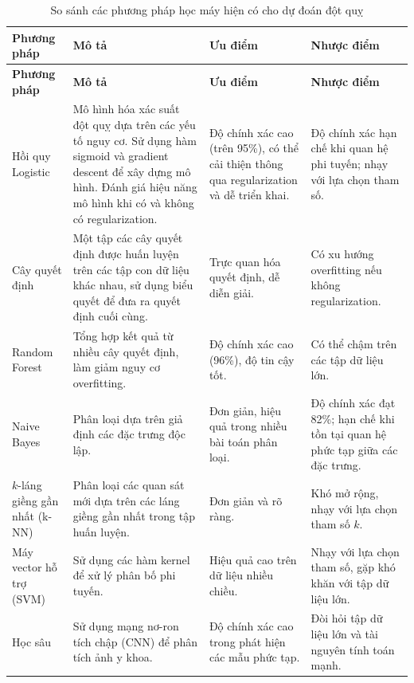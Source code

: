 \begin{longtable}{|L{2.3cm}|L{4.5cm}|L{3.7cm}|L{4.0cm}|}
	\caption{So sánh các phương pháp học máy hiện có cho dự đoán đột quỵ}
	\label{tab:methods}\\
	\hline
	\textbf{Phương pháp} &
	\textbf{Mô tả} &
	\textbf{Ưu điểm} &
	\textbf{Nhược điểm}\\
	\hline
	\endfirsthead
	
	\hline
	\textbf{Phương pháp} &
	\textbf{Mô tả} &
	\textbf{Ưu điểm} &
	\textbf{Nhược điểm}\\
	\hline
	\endhead
	
	Hồi quy Logistic &
	Mô hình hóa xác suất đột quỵ dựa trên các yếu tố nguy cơ. Sử dụng hàm sigmoid và gradient descent để xây dựng mô hình. Đánh giá hiệu năng mô hình khi có và không có regularization. &
	Độ chính xác cao (trên 95\%), có thể cải thiện thông qua regularization và dễ triển khai. &
	Độ chính xác hạn chế khi quan hệ phi tuyến; nhạy với lựa chọn tham số.\\
	\hline
	
	Cây quyết định &
	Một tập các cây quyết định được huấn luyện trên các tập con dữ liệu khác nhau, sử dụng biểu quyết để đưa ra quyết định cuối cùng. &
	Trực quan hóa quyết định, dễ diễn giải. &
	Có xu hướng overfitting nếu không regularization.\\
	\hline
	
	Random Forest &
	Tổng hợp kết quả từ nhiều cây quyết định, làm giảm nguy cơ overfitting. &
	Độ chính xác cao (96\%), độ tin cậy tốt. &
	Có thể chậm trên các tập dữ liệu lớn.\\
	\hline
	
	Naive Bayes &
	Phân loại dựa trên giả định các đặc trưng độc lập. &
	Đơn giản, hiệu quả trong nhiều bài toán phân loại. &
	Độ chính xác đạt 82\%; hạn chế khi tồn tại quan hệ phức tạp giữa các đặc trưng.\\
	\hline
	
	$k$-láng giềng gần nhất (k-NN) &
	Phân loại các quan sát mới dựa trên các láng giềng gần nhất trong tập huấn luyện. &
	Đơn giản và rõ ràng. &
	Khó mở rộng, nhạy với lựa chọn tham số $k$.\\
	\hline
	
	Máy vector hỗ trợ (SVM) &
	Sử dụng các hàm kernel để xử lý phân bố phi tuyến. &
	Hiệu quả cao trên dữ liệu nhiều chiều. &
	Nhạy với lựa chọn tham số, gặp khó khăn với tập dữ liệu lớn.\\
	\hline
	
	Học sâu &
	Sử dụng mạng nơ-ron tích chập (CNN) để phân tích ảnh y khoa. &
	Độ chính xác cao trong phát hiện các mẫu phức tạp. &
	Đòi hỏi tập dữ liệu lớn và tài nguyên tính toán mạnh.\\
	\hline
	

\end{longtable}
